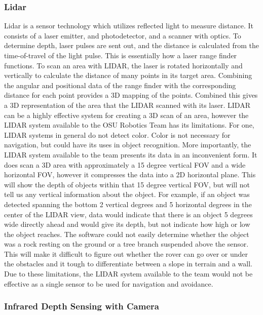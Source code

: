 \documentclass[10pt, oneside,onecolumn]{IEEEtran}
\begin{document}
\subsubsection{Lidar}

Lidar is a sensor technology which utilizes reflected light to measure distance. It consists of a laser emitter, and photodetector, and a scanner with optics. To determine depth, laser pulses are sent out, and the distance is calculated from the time-of-travel of the light pulse. This is essentially how a laser range finder functions. To scan an area with LIDAR, the laser is rotated horizontally and vertically to calculate the distance of many points in its target area. Combining the angular and positional data of the range finder with the corresponding distance for each point provides a 3D mapping of the points. Combined this gives a 3D representation of the area that the LIDAR scanned with its laser. 
LIDAR can be a highly effective system for creating a 3D scan of an area, however the LIDAR system available to the OSU Robotics Team has its limitations. For one, LIDAR systems in general do not detect color. Color is not necessary for navigation, but could have its uses in object recognition. More importantly, the LIDAR system available to the team presents its data in an inconvenient form. It does scan a 3D area with approximately a 15 degree vertical FOV and a wide horizontal FOV, however it compresses the data into a 2D horizontal plane. This will show the depth of objects within that 15 degree vertical FOV, but will not tell us any vertical information about the object. For example, if an object was detected spanning the bottom 2 vertical degrees and 5 horizontal degrees in the center of the LIDAR view, data would indicate that there is an object 5 degrees wide directly ahead and would give its depth, but not indicate how high or low the object reaches. The software could not easily determine whether the object was a rock resting on the ground or a tree branch suspended above the sensor. This will make it difficult to figure out whether the rover can go over or under the obstacles and it tough to differentiate between a slope in terrain and a wall. Due to these limitations, the LIDAR system available to the team would not be effective as a single sensor to be used for navigation and avoidance. 

\subsubsection{Infrared Depth Sensing with Camera}
\end{document}

